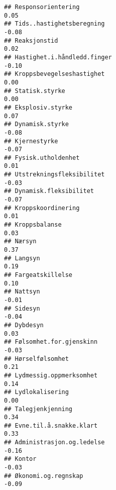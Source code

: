 \documentclass[
]{article}
\begin{document}
\begin{verbatim}
## Responsorientering                                                                0.05
## Tids..hastighetsberegning                                                        -0.08
## Reaksjonstid                                                                      0.02
## Hastighet.i.håndledd.finger                                                      -0.10
## Kroppsbevegelseshastighet                                                         0.00
## Statisk.styrke                                                                    0.00
## Eksplosiv.styrke                                                                  0.07
## Dynamisk.styrke                                                                  -0.08
## Kjernestyrke                                                                     -0.07
## Fysisk.utholdenhet                                                                0.01
## Utstrekningsfleksibilitet                                                        -0.03
## Dynamisk.fleksibilitet                                                           -0.07
## Kroppskoordinering                                                                0.01
## Kroppsbalanse                                                                     0.03
## Nærsyn                                                                            0.37
## Langsyn                                                                           0.19
## Fargeatskillelse                                                                  0.10
## Nattsyn                                                                          -0.01
## Sidesyn                                                                          -0.04
## Dybdesyn                                                                          0.03
## Følsomhet.for.gjenskinn                                                          -0.03
## Hørselfølsomhet                                                                   0.21
## Lydmessig.oppmerksomhet                                                           0.14
## Lydlokalisering                                                                   0.00
## Talegjenkjenning                                                                  0.34
## Evne.til.å.snakke.klart                                                           0.33
## Administrasjon.og.ledelse                                                        -0.16
## Kontor                                                                           -0.03
## Økonomi.og.regnskap                                                              -0.09

\end{verbatim}
\end{document}
